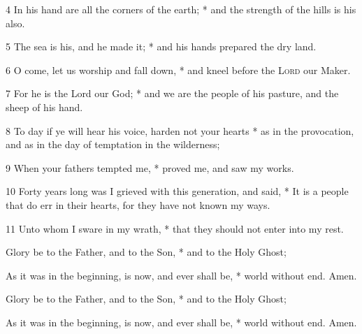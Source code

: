 4 In his hand are all the corners of the earth; * and the strength of the hills is his also.

5 The sea is his, and he made it; * and his hands prepared the dry land.

6 O come, let us worship and fall down, * and kneel before the {\scshape Lord} our Maker.

7 For he is the Lord our God; * and we are the people of his pasture, and the sheep of his hand.

8 To day if ye will hear his voice, harden not your hearts * as in the provocation, and as in the day of temptation in the wilderness;

9 When your fathers tempted me, * proved me, and saw my works.

10 Forty years long was I grieved with this generation, and said, * It is a people that do err in their hearts, for they have not known my ways.

11 Unto whom I sware in my wrath, * that they should not enter into my rest.

Glory be to the Father, and to the Son, * and to the Holy Ghost;

As it was in the beginning, is now, and ever shall be, * world without end. Amen.

\bigskip
{}
Glory be to the Father, and to the Son, * and to the Holy Ghost;

As it was in the beginning, is now, and ever shall be, * world without end. Amen.

\bigskip
{}



